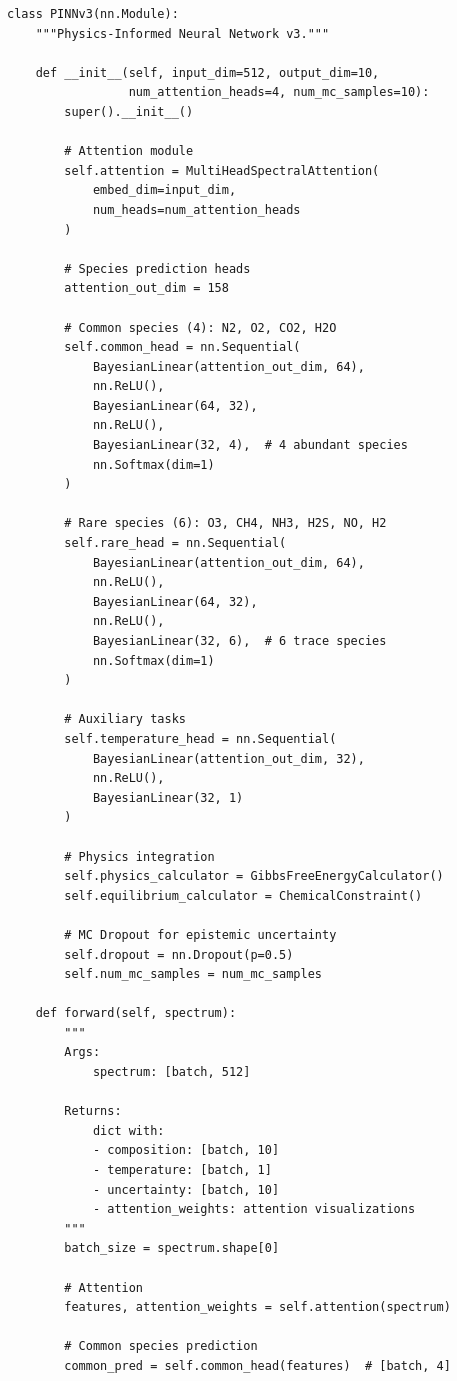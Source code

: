 \documentclass[12pt,a4paper,oneside]{report}
\begin{document}
\begin{lstlisting}
class PINNv3(nn.Module):
    """Physics-Informed Neural Network v3."""

    def __init__(self, input_dim=512, output_dim=10,
                 num_attention_heads=4, num_mc_samples=10):
        super().__init__()

        # Attention module
        self.attention = MultiHeadSpectralAttention(
            embed_dim=input_dim,
            num_heads=num_attention_heads
        )

        # Species prediction heads
        attention_out_dim = 158

        # Common species (4): N2, O2, CO2, H2O
        self.common_head = nn.Sequential(
            BayesianLinear(attention_out_dim, 64),
            nn.ReLU(),
            BayesianLinear(64, 32),
            nn.ReLU(),
            BayesianLinear(32, 4),  # 4 abundant species
            nn.Softmax(dim=1)
        )

        # Rare species (6): O3, CH4, NH3, H2S, NO, H2
        self.rare_head = nn.Sequential(
            BayesianLinear(attention_out_dim, 64),
            nn.ReLU(),
            BayesianLinear(64, 32),
            nn.ReLU(),
            BayesianLinear(32, 6),  # 6 trace species
            nn.Softmax(dim=1)
        )

        # Auxiliary tasks
        self.temperature_head = nn.Sequential(
            BayesianLinear(attention_out_dim, 32),
            nn.ReLU(),
            BayesianLinear(32, 1)
        )

        # Physics integration
        self.physics_calculator = GibbsFreeEnergyCalculator()
        self.equilibrium_calculator = ChemicalConstraint()

        # MC Dropout for epistemic uncertainty
        self.dropout = nn.Dropout(p=0.5)
        self.num_mc_samples = num_mc_samples

    def forward(self, spectrum):
        """
        Args:
            spectrum: [batch, 512]

        Returns:
            dict with:
            - composition: [batch, 10]
            - temperature: [batch, 1]
            - uncertainty: [batch, 10]
            - attention_weights: attention visualizations
        """
        batch_size = spectrum.shape[0]

        # Attention
        features, attention_weights = self.attention(spectrum)

        # Common species prediction
        common_pred = self.common_head(features)  # [batch, 4]


\end{lstlisting}
\end{document}
